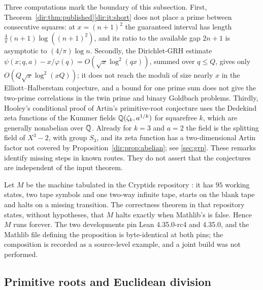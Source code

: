 \begin{remark}\label{dir:rem:limits}
Three computations mark the boundary of this subsection.
First, Theorem~\ref{dir:thm:published}\ref{dir:it:short} does not place a prime between
consecutive squares: at $x=(n+1)^2$ the guaranteed interval has length
$\tfrac4\pi(n+1)\log((n+1)^2)$, and its ratio to the available gap $2n+1$ is asymptotic
to $(4/\pi)\log n$. Secondly, the Dirichlet-GRH estimate
$\psi(x;q,a)-x/\varphi(q)=O(\sqrt x\log^2(qx))$, summed over $q\le Q$, gives only
$O(Q\sqrt x\log^2(xQ))$; it does not reach the moduli of size nearly $x$ in the
Elliott--Halberstam conjecture, and a bound for one prime sum does not give the
two-prime correlations in the twin prime and binary Goldbach problems. Thirdly,
Hooley's conditional proof of Artin's primitive-root conjecture
\cite{Hooley1967Artin,Lenstra1977Artin,Perucca2026Closed} uses the Dedekind zeta
functions of the Kummer fields $\mathbb{Q}(\zeta_k,a^{1/k})$ for squarefree $k$, which are
generally nonabelian over $\mathbb{Q}$. Already for $k=3$ and $a=2$ the field is the splitting
field of $X^3-2$, with group $S_3$, and its zeta function has a two-dimensional Artin
factor not covered by Proposition~\ref{dir:prop:abelian}; see \cref{sec:grp}. These remarks
identify missing steps in known routes. They do not assert that the conjectures are
independent of the input theorem.
\end{remark}

\begin{remark}\label{dir:rem:riemann95}
Let $M$ be the machine  tabulated in the Cryptids repository
\cite{DeepMindCryptids}: it has $95$ working states, two tape symbols and one two-way
infinite tape, starts on the blank tape and halts on a missing transition. The
correctness theorem in that repository states, without hypotheses, that $M$ halts
exactly when Mathlib's  is false. Hence $M$ runs forever. The
two developments pin Lean 4.35.0-rc4 and 4.35.0, and the Mathlib file defining the
proposition is byte-identical at both pins; the composition is recorded as a
source-level example, and a joint build was not performed.
\end{remark}

\subsection{Primitive roots and Euclidean division}\label{dir:sec:roots}

